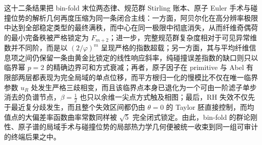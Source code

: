 


\noindent
这十二条结果把 bin-fold 末位两态律、规范群 Stirling 账本、原子 Euler 手术与碰撞位势的解析几何再度压缩为同一条闭合主线：一方面，阿贝尔化在高分辨率极限中达到全部稳定类型的最终满秩，而中心在同一极限中彻底消失，从而纤维奇偶荷的最小完备秩被严格锁定为 \(F_{m+2}\)；进一步，完整规范群复杂度相对于可见异常维数并不同阶，而是以 \((2/\varphi)^m\) 呈现严格的指数超载；另一方面，其与平均纤维信息项之间仍保留一条由黄金比锁定的线性响应斜率，纯碰撞误差指数的缺口则只以临界幂 \(p=2\) 的精确边界可和方式衰减；再者，原子因子在 primitive 与 Abel 有限部两层都表现为完全局域的单点位移，而平方根归一化的慢模比不仅在唯一临界参数 \(u_R\) 处发生严格三歧相变，而且该临界点本身已退化为一个可由一阶滤子单步消去的负谱节点，\(\beta=\tfrac12\) 也只以余维一尖点方式触及相图；最后，RH 失效不仅先于最近复分歧发生，而且整个失效区间都仍由 \(\theta=0\) 的 Taylor 胚直接控制，而均值点的大偏差率函数曲率常数同样被 \(\sqrt5\) 完全闭式锁定。由此，bin-fold 的群论刚性、原子谱的局域手术与碰撞位势的局部热力学几何便被统一收束到同一组可审计的终端后果之中。







\endinput
